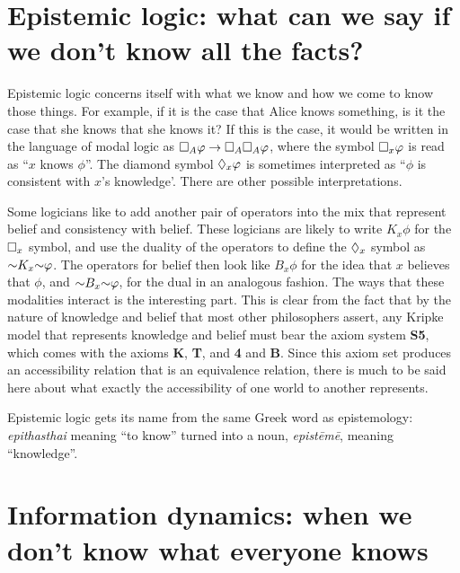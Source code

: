 \section{Epistemic logic: what can we say if we don't know all the facts?}

Epistemic logic concerns itself with what we know and how we come to know those things. For example, if it is the case that Alice knows
something, is it the case that she knows that she knows it? If this is the case, it would be written in the language of modal logic as
$\square_A \varphi \rightarrow \square_A \square_A \varphi$, where the symbol $\square_x \varphi$ is read as ``$x$ knows $\phi$''. The diamond
symbol $\lozenge_x \varphi$ is sometimes interpreted as ``$\phi$ is consistent with $x$'s knowledge'. There are other possible interpretations.

Some logicians like to add another pair of operators into the mix that represent belief and consistency with belief. These logicians are likely
to write $K_x \phi$ for the $\square_x$ symbol, and use the duality of the operators to define the $\lozenge_x$ symbol as $\mathord{\sim} K_x
\mathord{\sim} \varphi$. The operators for belief then look like $B_x \phi$ for the idea that $x$ believes that $\phi$, and $\mathord{\sim} B_x \mathord{\sim} \varphi$,
for the dual in an analogous fashion. The ways that these modalities interact is the interesting part. This is clear from the fact that
by the nature of knowledge and belief that most other philosophers assert, any Kripke model that represents knowledge and belief must bear the
axiom system \textbf{S5}, which comes with the axioms \textbf{K}, \textbf{T}, and \textbf{4} and \textbf{B}. Since this axiom set produces an
accessibility relation that is an equivalence relation, there is much to be said here about what exactly the accessibility of one world to another
represents. 

Epistemic logic gets its name from the same Greek word as epistemology: \emph{epithasthai} meaning ``to know'' turned into a noun, \emph{epist\=em\=e},
meaning ``knowledge''.

\section{Information dynamics: when we don't know what everyone knows}

